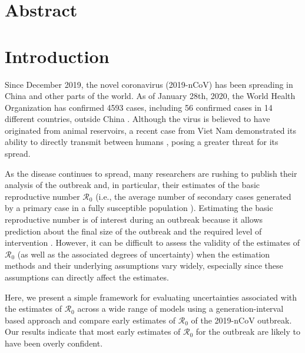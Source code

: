 \documentclass[12pt]{article}
\date{\today}
\begin{document}
\begin{flushleft}{
	\Large
	\textbf{}
}

\bigskip

\end{flushleft}

\section*{Abstract}

\pagebreak

\section{Introduction}

Since December 2019, the novel coronavirus (2019-nCoV) has been
spreading in China and other parts of the world.
As of January 28th, 2020, the World Health Organization has
confirmed 4593 cases, including 56 confirmed cases in 14 different
countries, outside China \citep{who28report}.
Although the virus is believed to have originated
from animal reservoirs, a recent case from Viet Nam
demonstrated its ability to directly transmit between
humans \citep{who26report},
posing a greater threat for its spread.

As the disease continues to spread, 
many researchers are rushing to publish their 
analysis of the outbreak and, in particular, their
estimates of the basic reproductive number $\mathcal R_0$ (i.e., the 
average number of secondary cases generated 
by a primary case in a fully susceptible population \citep{anderson1991infectious, diekmann1990definition}).
Estimating the basic reproductive number is of interest during an outbreak
because it allows prediction about the final size of the outbreak \citep{anderson1991infectious, ma2006generality, arino2007final, andreasen2011final, miller2012note} and the required level of intervention \citep{anderson1991infectious}.
However, it can be difficult to assess the validity of the estimates of $\mathcal R_0$ (as well as the associated degrees of uncertainty)
when the estimation methods and their underlying assumptions vary widely,
especially since these assumptions can directly affect the estimates.

Here, we present a simple framework for evaluating uncertainties 
associated with the estimates of $\mathcal R_0$
across a wide range of models using a generation-interval based approach and compare early estimates of $\mathcal R_0$ of the 2019-nCoV outbreak.
Our results indicate that most early estimates of $\mathcal R_0$ for the outbreak
are likely to have been overly confident.
\end{document}
